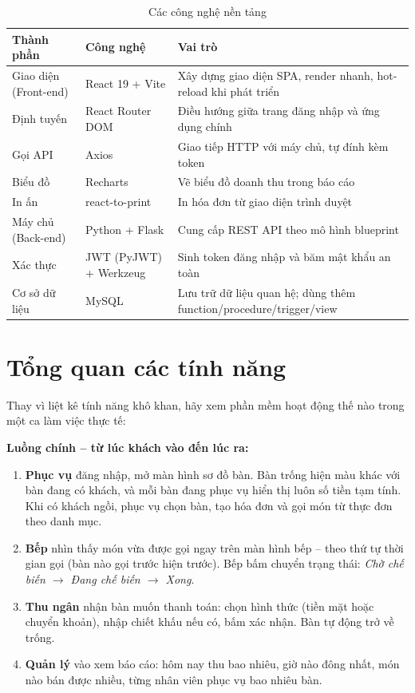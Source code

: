 \documentclass[12pt,a4paper]{report}
\begin{document}
\begin{table}[H]
\centering
\caption{Các công nghệ nền tảng}
\begin{tabularx}{\textwidth}{L{3cm} L{3.5cm} X}
\toprule
\textbf{Thành phần} & \textbf{Công nghệ} & \textbf{Vai trò} \\
\midrule
Giao diện (Front-end) & React 19 + Vite & Xây dựng giao diện SPA, render nhanh, hot-reload khi phát triển \\
Định tuyến & React Router DOM & Điều hướng giữa trang đăng nhập và ứng dụng chính \\
Gọi API & Axios & Giao tiếp HTTP với máy chủ, tự đính kèm token \\
Biểu đồ & Recharts & Vẽ biểu đồ doanh thu trong báo cáo \\
In ấn & react-to-print & In hóa đơn từ giao diện trình duyệt \\
Máy chủ (Back-end) & Python + Flask & Cung cấp REST API theo mô hình blueprint \\
Xác thực & JWT (PyJWT) + Werkzeug & Sinh token đăng nhập và băm mật khẩu an toàn \\
Cơ sở dữ liệu & MySQL & Lưu trữ dữ liệu quan hệ; dùng thêm function/procedure/trigger/view \\
\bottomrule
\end{tabularx}
\end{table}

\section{Tổng quan các tính năng}

Thay vì liệt kê tính năng khô khan, hãy xem phần mềm hoạt động thế nào trong một ca làm việc thực tế:

\textbf{Luồng chính -- từ lúc khách vào đến lúc ra:}
\begin{enumerate}
  \item \textbf{Phục vụ} đăng nhập, mở màn hình sơ đồ bàn. Bàn trống hiện màu khác với bàn đang có khách, và mỗi bàn đang phục vụ hiển thị luôn số tiền tạm tính. Khi có khách ngồi, phục vụ chọn bàn, tạo hóa đơn và gọi món từ thực đơn theo danh mục.
  \item \textbf{Bếp} nhìn thấy món vừa được gọi ngay trên màn hình bếp -- theo thứ tự thời gian gọi (bàn nào gọi trước hiện trước). Bếp bấm chuyển trạng thái: \textit{Chờ chế biến $\rightarrow$ Đang chế biến $\rightarrow$ Xong}.
  \item \textbf{Thu ngân} nhận bàn muốn thanh toán: chọn hình thức (tiền mặt hoặc chuyển khoản), nhập chiết khấu nếu có, bấm xác nhận. Bàn tự động trở về trống.
  \item \textbf{Quản lý} vào xem báo cáo: hôm nay thu bao nhiêu, giờ nào đông nhất, món nào bán được nhiều, từng nhân viên phục vụ bao nhiêu bàn.
\end{enumerate}
\end{document}
